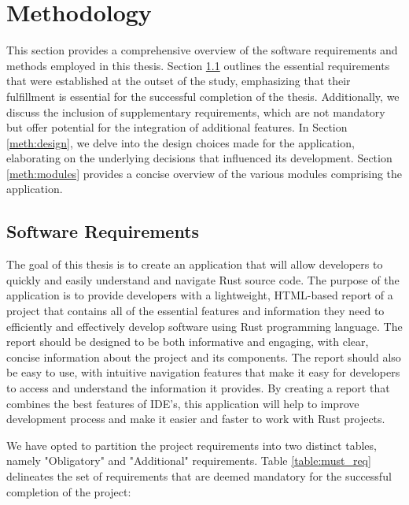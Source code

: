 \chapter{Methodology}
\label{chap:met}

This section provides a comprehensive overview of the software requirements and methods employed in this thesis. Section \ref{meth:req} outlines the essential requirements that were established at the outset of the study, emphasizing that their fulfillment is essential for the successful completion of the thesis. Additionally, we discuss the inclusion of supplementary requirements, which are not mandatory but offer potential for the integration of additional features. In Section \ref{meth:design}, we delve into the design choices made for the application, elaborating on the underlying decisions that influenced its development. Section \ref{meth:modules} provides a concise overview of the various modules comprising the application.

\section{Software Requirements}
\label{meth:req}
The goal of this thesis is to create an application that will allow developers to quickly and easily understand and navigate Rust source code. The purpose of the application is to provide developers with a lightweight, HTML-based report of a project that contains all of the essential features and information they need to efficiently and effectively develop software using Rust programming language. The report should be designed to be both informative and engaging, with clear, concise information about the project and its components. The report should also be easy to use, with intuitive navigation features that make it easy for developers to access and understand the information it provides. By creating a report that combines the best features of IDE's, this application will help to improve development process and make it easier and faster to work with Rust projects.


We have opted to partition the project requirements into two distinct tables, namely "Obligatory" and "Additional" requirements. Table \ref{table:must_req} delineates the set of requirements that are deemed mandatory for the successful completion of the project:


